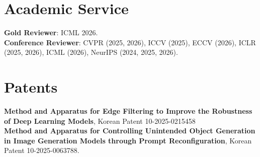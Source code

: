\documentclass[10pt, letterpaper]{article}
\begin{document}
\section{Academic Service}
{\small
\textbf{Gold Reviewer}: ICML 2026.\\
\textbf{Conference Reviewer}: CVPR (2025, 2026), ICCV (2025), ECCV (2026), ICLR (2025, 2026), ICML (2026), NeurIPS (2024, 2025, 2026).
}

\section{Patents}
{\small
\textbf{Method and Apparatus for Edge Filtering to Improve the Robustness of Deep Learning Models}, Korean Patent 10-2025-0215458\\
\textbf{Method and Apparatus for Controlling Unintended Object Generation in Image Generation Models through Prompt Reconfiguration}, Korean Patent 10-2025-0063788.
}
\end{document}
